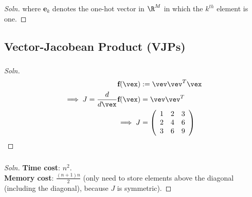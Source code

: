 \documentclass{article}
\begin{document}
\begin{proof}[Soln]
		where \textbf{e}$_k$ denotes the one-hot vector in $\R^M$ in which the $k^{th}$ element is one.
	\end{proof}
	\subsection{Vector-Jacobean Product (VJPs)}
	\subsubsection{}
	\begin{proof}[Soln]
		\begin{align}
			\textbf{f}(\vex) &:= \vev \vev^T \vex \\
			\implies J = \frac{d}{d\vex} \textbf{f}(\vex) &= \vev \vev^T \\
			\implies J &=
			\left(
			\begin{array}{ccc}
			 1 & 2 & 3 \\
			 2 & 4 & 6 \\
			 3 & 6 & 9 \\
			\end{array}
			\right)
		\end{align}
	\end{proof}
	
	\subsubsection{}
	\begin{proof}[Soln]
		\textbf{Time cost}: $n^2$. \\
		\textbf{Memory cost}: $\frac{(n+1)n}{2}$ (only need to store elements above the diagonal (including the diagonal), because $J$ is symmetric).
	\end{proof}
\end{document}
